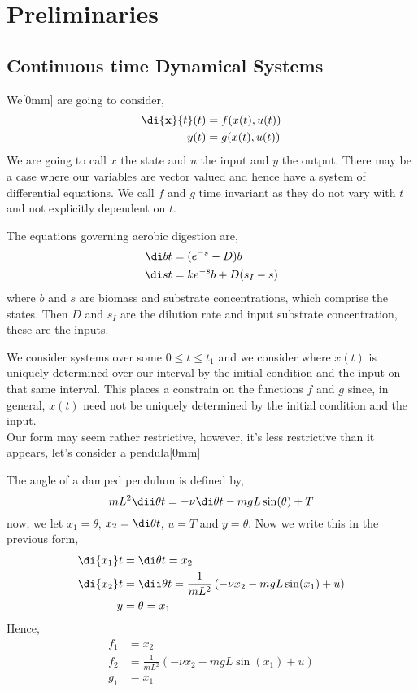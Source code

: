 
\section{Preliminaries}

\subsection{Continuous time Dynamical Systems}
We[0mm] are going to consider,
\begin{align*}
  \di{\mathbf{x}}{t} (t) &= f(x(t), u(t))\\
  y(t) &= g(x(t), u(t))
\end{align*}
We are going to call $x$ the state and $u$ the input and $y$ the output. There may be a case where our variables are vector valued and hence have a system of differential equations. We call $f$ and $g$ time invariant as they do not vary with $t$ and not explicitly dependent on $t$.

\begin{eg}
  The equations governing aerobic digestion are,
  \begin{align*}
    \di b t &= (e^{-s} - D)b \\
    \di s t &= ke^{-s}b + D(s_I - s)
  \end{align*}
  where $b$ and $s$ are biomass and substrate concentrations, which comprise the states. Then $D$ and $s_I$ are the dilution rate and input substrate concentration, these are the inputs.
\end{eg}

We consider systems over some $0 \le t \le t_1$ and we consider where $x(t)$ is uniquely determined over our interval by the initial condition and the input on that same interval. This places a constrain on the functions $f$ and $g$ since, in general, $x(t)$ need not be uniquely determined by the initial condition and the input.\\

Our form may seem rather restrictive, however, it's less restrictive than it appears, let's consider a pendula[0mm]
\begin{eg}
  The angle of a damped pendulum is defined by,
  $$ mL^2\dii \theta t = -\nu \di \theta t - mgL\sin(\theta) + T $$
  now, we let $x_1 = \theta$, $x_2 = \di \theta t$, $u = T$ and $y = \theta$. Now we write this in the previous form,
  \begin{align*}
    \di {x_1} t &= \di \theta t = x_2 \\
    \di {x_2} t &= \dii \theta t = \frac{1}{mL^2}\left( -\nu x_2 - mgL\sin (x_1) + u\right)\\
    y &= \theta = x_1
  \end{align*}
  Hence,
  \begin{align*}
    f_1 &= x_2\\
    f_2 &= \frac{1}{mL^2}\left( -\nu x_2 - mgL\sin (x_1) + u\right)\\
    g_1 &= x_1
  \end{align*}
\end{eg}

